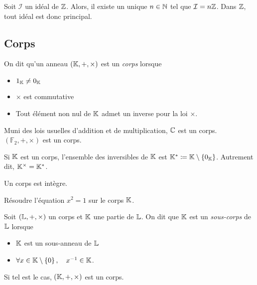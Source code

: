 \documentclass{magnolia}
\begin{document}
\begin{remarqueUnique}
\remarque Soit $\mathcal{I}$ un idéal de $\mathbb{Z}$. Alors, il existe un unique $n\in\mathbb{N}$
  tel que $\mathcal{I}=n\mathbb{Z}$. Dans $\mathbb{Z}$, tout idéal est donc principal.
\end{remarqueUnique}

\subsection{Corps}

\begin{definition}
On dit qu'un anneau $\left(\mathbb{K},+,\times\right)$ est un \emph{corps} lorsque
\begin{itemize}
\item $1_{\mathbb{K}}\neq 0_{\mathbb{K}}$
\item $\times$ est commutative
\item Tout élément non nul de $\mathbb{K}$ admet un inverse pour la loi $\times$.
\end{itemize}
\end{definition}

\begin{exemples}
\exemple Muni des lois usuelles d'addition et de multiplication, $\mathbb{C}$ est un corps.
\exemple $(\mathbb{F}_2,+,\times)$ est un corps.
\end{exemples}

\begin{remarqueUnique}
\remarque Si $\mathbb{K}$ est un corps, l'ensemble des
  inversibles de $\mathbb{K}$ est $\mathbb{K}^*\coloneqq\mathbb{K}\setminus\left\{0_{\mathbb{K}}\right\}$. Autrement dit, $\mathbb{K}^{\times}=\mathbb{K}^*$.
\end{remarqueUnique}

\begin{proposition}
Un corps est intègre.  
\end{proposition}

\begin{exoUnique}
\exo Résoudre l'équation $x^2=1$ sur le corps $\mathbb{K}$.
\end{exoUnique}


\begin{definition}
Soit $\left(\mathbb{L},+,\times\right)$ un corps et $\mathbb{K}$ une partie de $\mathbb{L}$. On dit que $\mathbb{K}$
est un \emph{sous-corps} de $\mathbb{L}$ lorsque
\begin{itemize}
\item $\mathbb{K}$ est un sous-anneau de $\mathbb{L}$
\item $\forall x\in\mathbb{K}\setminus\left\{0\right\} ,\quad x^{-1}\in\mathbb{K}$.
\end{itemize}
Si tel est le cas, $\left(\mathbb{K},+,\times\right)$ est un corps.
\end{definition}
\end{document}
